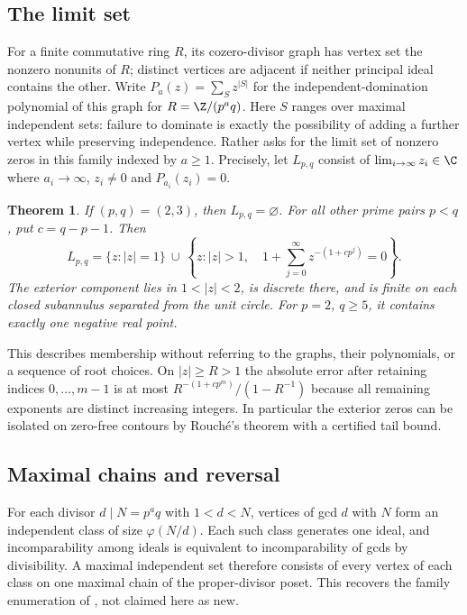 \documentclass[11pt,a4paper]{article}
\numberwithin{equation}{section}
\newtheorem{theorem}{Theorem}[section]
\theoremstyle{definition}
\theoremstyle{remark}
\begin{document}
\subsection{The limit set}
For a finite commutative ring $R$, its cozero-divisor graph has vertex set the nonzero nonunits of $R$; distinct vertices are adjacent if neither principal ideal contains the other. Write $P_a(z)=\sum_S z^{|S|}$ for the independent-domination polynomial of this graph for $R=\Z/(p^a q)$. Here $S$ ranges over maximal independent sets: failure to dominate is exactly the possibility of adding a further vertex while preserving independence. Rather \cite{r42reiwa:SMJ} asks for the limit set of nonzero zeros in this family indexed by $a\ge1$. Precisely, let $L_{p,q}$ consist of $\lim_{i\to\infty} z_i\in\C$ where $a_i\to\infty$, $z_i\ne0$ and $P_{a_i}(z_i)=0$.

\begin{theorem}\label{r42reiwa:main}
If $(p,q)=(2,3)$, then $L_{p,q}=\varnothing$. For all other prime pairs $p<q$, put $c=q-p-1$. Then
\[
 L_{p,q}=\{z:|z|=1\}\ \cup\
 \left\{z:|z|>1,\quad 1+\sum_{j=0}^\infty z^{-(1+c p^j)}=0\right\}.
\]
The exterior component lies in $1<|z|<2$, is discrete there, and is finite on each closed subannulus separated from the unit circle. For $p=2$, $q\ge5$, it contains exactly one negative real point.
\end{theorem}

This describes membership without referring to the graphs, their polynomials, or a sequence of root choices. On $|z|\ge R>1$ the absolute error after retaining indices $0,\ldots,m-1$ is at most
$R^{-(1+c p^m)}/(1-R^{-1})$ because all remaining exponents are distinct increasing integers. In particular the exterior zeros can be isolated on zero-free contours by Rouch\'e's theorem with a certified tail bound.

\subsection{Maximal chains and reversal}
For each divisor $d\mid N=p^a q$ with $1<d<N$, vertices of gcd $d$ with $N$ form an independent class of size $\varphi(N/d)$. Each such class generates one ideal, and incomparability among ideals is equivalent to incomparability of gcds by divisibility. A maximal independent set therefore consists of every vertex of each class on one maximal chain of the proper-divisor poset. This recovers the family enumeration of \cite[Thm.~2.2]{r42reiwa:DML}, not claimed here as new.
\end{document}
